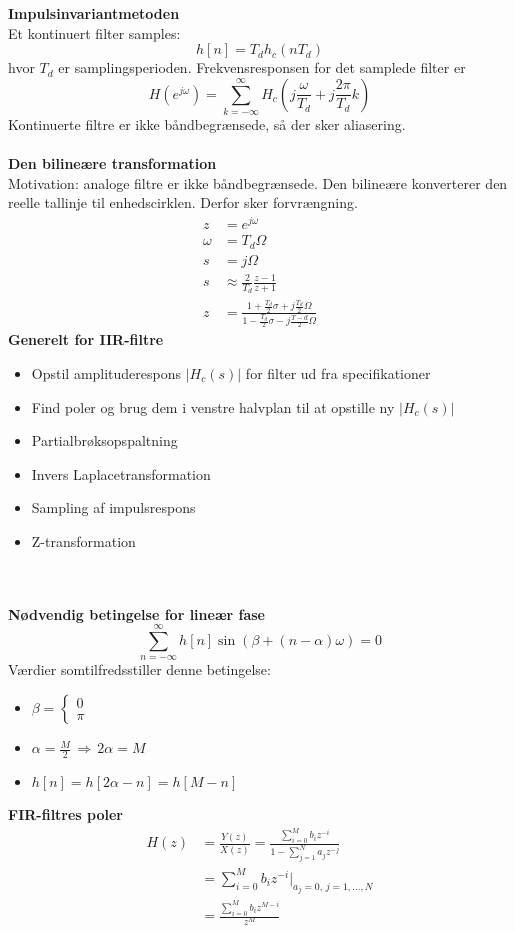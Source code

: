 \documentclass[12pt,a4paper]{report}
\begin{document}
\textbf{Impulsinvariantmetoden}\\
Et kontinuert filter samples:
\begin{equation}
h[n]=T_dh_c(nT_d)
\end{equation}
hvor $T_d$ er samplingsperioden. Frekvensresponsen for det samplede filter er
\begin{equation}
H(e^{j\omega})=\sum_{k=-\infty}^{\infty}H_c\left(j\frac{\omega}{T_d}+j\frac{2\pi}{T_d}k\right)
\end{equation}
Kontinuerte filtre er ikke båndbegrænsede, så der sker aliasering.\\\\
\textbf{Den bilineære transformation}\\
Motivation: analoge filtre er ikke båndbegrænsede. Den bilineære konverterer den reelle tallinje til enhedscirklen. Derfor sker forvrængning.
\begin{align*}
z&=e^{j\omega}\\
\omega&=T_d\Omega\\
s&=j\Omega\\
s&\approx\frac{2}{T_d}\frac{z-1}{z+1}\\
z&=\frac{1+\frac{T_d}{2}\sigma+j\frac{T_d}{2}\Omega}{1-\frac{T_d}{2}\sigma-j\frac{T-d}{2}\Omega}
\end{align*}
\textbf{Generelt for IIR-filtre}
\begin{itemize}
\item Opstil amplituderespons $|H_c(s)|$ for filter ud fra specifikationer
\item Find poler og brug dem i venstre halvplan til at opstille ny $|H_c(s)|$
\item Partialbrøksopspaltning
\item Invers Laplacetransformation
\item Sampling af impulsrespons
\item Z-transformation
\end{itemize}
\clearpage
{}\\\\
\textbf{Nødvendig betingelse for lineær fase}
\begin{equation}
\sum_{n=-\infty}^{\infty}h[n]\sin(\beta+(n-\alpha)\omega)=0
\end{equation}
Værdier somtilfredsstiller denne betingelse:
\begin{itemize}
\item $\beta=\begin{cases}0\\\pi\end{cases}$
\item $\alpha=\frac{M}{2}\,\Rightarrow\,2\alpha=M$
\item $h[n]=h[2\alpha-n]=h[M-n]$
\end{itemize}
\textbf{FIR-filtres poler}
\begin{align*}
H(z)&=\frac{Y(z)}{X(z)}=\frac{\sum_{i=0}^Mb_iz^{-i}}{1-\sum_{j=1}^Na_jz^{-j}}\\
&=\sum_{i=0}^Mb_iz^{-i}\bigg|_{a_j=0,\,j=1,\ldots,N}\\
&=\frac{\sum_{i=0}^{M}b_iz^{M-i}}{z^M}
\end{align*}
\end{document}
